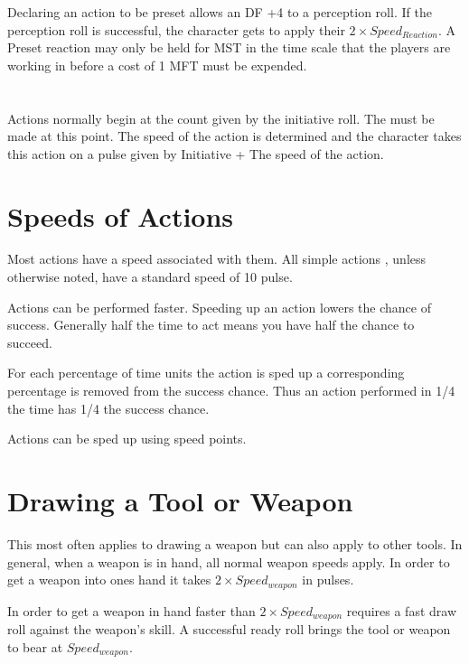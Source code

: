 Declaring an action to be preset allows an DF +4 to a perception roll. If the perception roll is successful, the 
character gets to apply their $ 2 \times Speed_{Reaction} $. A Preset reaction may only be held for MST 
in the time scale that the players are working in before a cost of 1 MFT must be expended.

\section{}

Actions normally begin at the count given by the initiative roll. The 
must be made at this point. The speed of the action is determined and 
the character takes this action on a pulse given by Initiative + The speed of the action.  

\section{Speeds of Actions}

Most actions have a speed associated with them. All simple actions
, unless otherwise noted, have a standard speed of 10 pulse. 




Actions can be performed faster. Speeding up an action lowers the
chance of success. Generally half the time to act means you have half the chance to succeed.

For each percentage of time units the action is sped up a corresponding percentage is removed from 
the success chance. Thus an action performed in 1/4 the time has 1/4 the success chance.

Actions can be sped up using speed points. 


\section{Drawing a Tool or Weapon}


This most often applies to drawing a weapon but can also apply to 
other tools. In general, when a weapon is in hand, all normal weapon 
speeds apply. In order to get a weapon into ones hand it takes 
\( 2 \times Speed_{weapon} \) in pulses. 

In order to get a weapon in hand faster than \( 2 \times 
Speed_{weapon} \) requires a fast draw roll against the weapon's 
skill. A successful ready roll brings the tool or weapon to bear at
\( Speed_{weapon} \).



